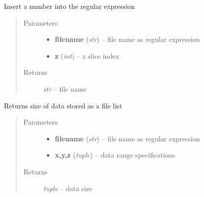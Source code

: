 \documentclass[letterpaper,10pt,english]{sphinxmanual}
\begin{document}
\begin{fulllineitems}
\label{api/ClearMap.IO:ClearMap.IO.FileList.fileExperssionToFileName}
Insert a number into the regular expression
\begin{quote}\begin{description}
\item[{Parameters}] \leavevmode\begin{itemize}
\item {} 
\textbf{filename} (\emph{str}) --
file name as regular expression

\item {} 
\textbf{z} (\emph{int}) --
z slice index

\end{itemize}

\item[{Returns}] \leavevmode
\emph{str} --
file name

\end{description}\end{quote}

\end{fulllineitems}


\begin{fulllineitems}
\label{api/ClearMap.IO:ClearMap.IO.FileList.dataSize}
Returns size of data stored as a file list
\begin{quote}\begin{description}
\item[{Parameters}] \leavevmode\begin{itemize}
\item {} 
\textbf{filename} (\emph{str}) --
file name as regular expression

\item {} 
\textbf{x,y,z} (\emph{tuple}) --
data range specifications

\end{itemize}

\item[{Returns}] \leavevmode
\emph{tuple} --
data size

\end{description}\end{quote}

\end{fulllineitems}
\end{document}

